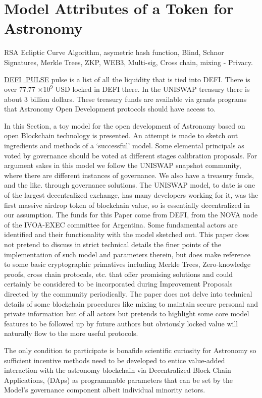 \documentclass[final,5p,times,twocolumn,authoryear]{elsarticle}
\begin{document}
 \section{Model Attributes of a Token for Astronomy}
\label{sec:btc4}
RSA Ecliptic Curve Algorithm, asymetric hash function, Blind, Schnor Signatures, Merkle Trees, ZKP,  WEB3, Multi-sig, Cross chain, mixing - Privacy. 

\href{https://defipulse.com/}{DEFI$\;$ PULSE} pulse is a list of all the liquidity that is tied into DEFI. There is over 77.77 $\times 10^{9}$ USD locked in DEFI there. In the UNISWAP treasury there is about 3 billion dollars. These treasury funds are available via grants programs that Astronomy Open Development protocols should have access to.

In this Section, a toy model for the open development of Astronomy based on open Blockchain technology is presented. An attempt is made to sketch out ingredients and methods of a `successful' model. Some elemental principals as voted by governance should be voted at different stages calibration proposals. For argument sakes in this model we follow the UNISWAP snapshot community, where there are different instances of governance. We also have a treasury funds, and the like.  through governance solutions. The UNISWAP model, to date is one of the largest decentralized exchange, has many developers working for it, was the first massive airdrop token of blockchain value, so is essentially decentralized in our assumption. The funds for this Paper come from DEFI, from the NOVA node of the IVOA-EXEC committee for Argentina. Some fundamental actors are identified and their functionality with the model sketched out. This paper does not pretend to discuss in strict technical details the finer points of the implementation of such model and parameters therein, but does make reference to some basic cryptographic primatives including Merkle Trees, Zero-knowledge proofs, cross chain protocals, etc. that offer promising solutions and could certainly be considered to be incorporated during Improvement Proposals directed by the community periodically. The paper does not delve into technical details of some blockchain procedures like mixing to maintain secure personal and private information but of all actors but pretends to highlight some core model features to be followed up by future authors but obviously  locked value will naturally flow to the more useful protocols.  
 
The only condition to participate is bonafide scientific curiosity for Astronomy so sufficient incentive methods need to be developed to entice value-added interaction with the astronomy blockchain via Decentralized Block Chain Applications, (DAps) as programmable parameters that can be set by the Model's governance component albeit individual minority actors. 
\end{document}
